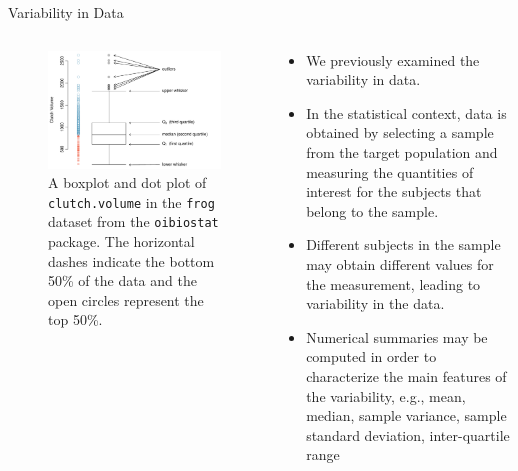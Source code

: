 \documentclass[10pt,handout]{beamer}\usepackage[]{graphicx}\usepackage[]{color}
\makeatletter
\def\maxwidth{ %
  \ifdim\Gin@nat@width>\linewidth
    \linewidth
  \else
    \Gin@nat@width
  \fi
}
\newenvironment{knitrout}{}{} %
\makeatother
\begin{document}
\begin{frame}[fragile]{Variability in Data}
	\begin{columns}
		\begin{column}{0.5\textwidth}  %
\begin{knitrout}\tiny
{}\color{fgcolor}\begin{figure}

{\centering \includegraphics[width=\maxwidth]{figure/unnamed-chunk-1-1} 

}

\caption{A boxplot and dot plot of \texttt{clutch.volume} in the \texttt{frog} dataset from the \texttt{oibiostat} package. The horizontal dashes indicate the bottom 50\% of the data and the open circles represent the top 50\%.}\label{fig:unnamed-chunk-1}
\end{figure}

\end{knitrout}
		\end{column}
		\begin{column}{0.5\textwidth}
			\begin{itemize}
				\item We previously examined the variability in data. 
				\item In the statistical context, data is obtained by selecting a sample from the
				target population and measuring the quantities of interest for the
				subjects that belong to the sample. 
				\item Different subjects in the sample may obtain different values for the measurement, leading to variability in
				the data.
				\item Numerical summaries may be computed in order to characterize the main
				features of the variability, e.g., mean, median, sample variance, sample standard deviation, inter-quartile range
			\end{itemize}
		\end{column}
	\end{columns}
\end{frame}
\end{document}
